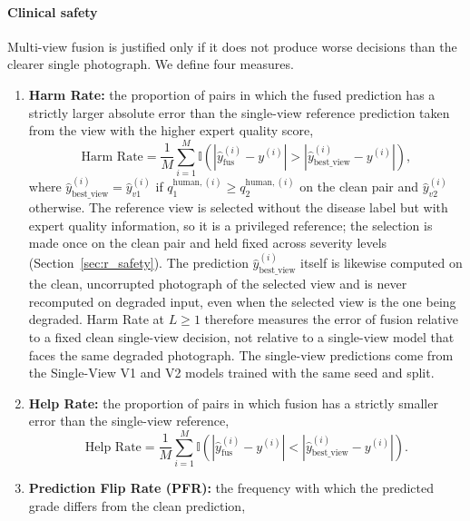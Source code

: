 \documentclass[final,5p,times,twocolumn,authoryear]{elsarticle}
\theoremstyle{plain}
\theoremstyle{remark}
\begin{document}
\paragraph{Clinical safety} Multi-view fusion is justified only if it does not produce worse decisions than the clearer single photograph. We define four measures.
\begin{enumerate}
  \item \textbf{Harm Rate:} the proportion of pairs in which the fused prediction has a strictly larger absolute error than the single-view reference prediction taken from the view with the higher expert quality score,
    \begin{equation}
      \text{Harm Rate} = \frac{1}{M} \sum_{i=1}^M \mathbb{I}\left( |\hat{y}_{\text{fus}}^{(i)} - y^{(i)}| > |\hat{y}_{\text{best\_view}}^{(i)} - y^{(i)}| \right),
      \label{eq:harm_rate}
    \end{equation}
    where $\hat{y}_{\text{best\_view}}^{(i)} = \hat{y}_{v1}^{(i)}$ if $q_1^{\text{human},(i)} \ge q_2^{\text{human},(i)}$ on the clean pair and $\hat{y}_{v2}^{(i)}$ otherwise. The reference view is selected without the disease label but with expert quality information, so it is a privileged reference; the selection is made once on the clean pair and held fixed across severity levels (Section~\ref{sec:r_safety}).
The prediction $\hat{y}_{\text{best\_view}}^{(i)}$ itself is likewise computed on the clean, uncorrupted photograph of the selected view and is never recomputed on degraded input, even when the selected view is the one being degraded. Harm Rate at $L \ge 1$ therefore measures the error of fusion relative to a fixed clean single-view decision, not relative to a single-view model that faces the same degraded photograph.
The single-view predictions come from the Single-View V1 and V2 models trained with the same seed and split.
  \item \textbf{Help Rate:} the proportion of pairs in which fusion has a strictly smaller error than the single-view reference,
    \begin{equation}
      \text{Help Rate} = \frac{1}{M} \sum_{i=1}^M \mathbb{I}\left( |\hat{y}_{\text{fus}}^{(i)} - y^{(i)}| < |\hat{y}_{\text{best\_view}}^{(i)} - y^{(i)}| \right).
      \label{eq:help_rate}
    \end{equation}
  \item \textbf{Prediction Flip Rate (PFR):} the frequency with which the predicted grade differs from the clean prediction,
    \begin{equation}

\end{equation}
\end{enumerate}
\end{document}
